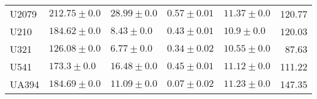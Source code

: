 \begin{tabular}{lllllr}
      U2079 &     $212.75 \pm 0.0$ &       $28.99 \pm 0.0$ &  $0.57 \pm 0.01$ &  $11.37 \pm 0.0$ &    120.77 \\
       U210 &     $184.62 \pm 0.0$ &        $8.43 \pm 0.0$ &  $0.43 \pm 0.01$ &   $10.9 \pm 0.0$ &    120.03 \\
       U321 &     $126.08 \pm 0.0$ &        $6.77 \pm 0.0$ &  $0.34 \pm 0.02$ &  $10.55 \pm 0.0$ &     87.63 \\
       U541 &      $173.3 \pm 0.0$ &       $16.48 \pm 0.0$ &  $0.45 \pm 0.01$ &  $11.12 \pm 0.0$ &    111.22 \\
      UA394 &     $184.69 \pm 0.0$ &       $11.09 \pm 0.0$ &  $0.07 \pm 0.02$ &  $11.23 \pm 0.0$ &    147.35 \\
\bottomrule
\end{tabular}
